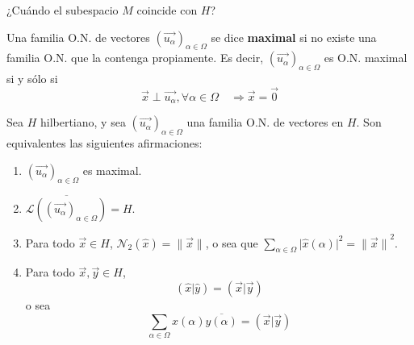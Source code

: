 \documentclass[12pt]{report}
\theoremstyle{largebreak}
\newcommand\abs[1]{\ensuremath{\big|#1\big|}}
\newcommand\norm[1]{\ensuremath{\|#1\|}}
\newcommand\pint[2]{\ensuremath{\left(#1\big| #2\right)}}
\newcommand\conj[1]{\ensuremath{\overline{#1}}}
\newcommand{\N}[2]{\ensuremath{\mathcal{N}_{#1}\left(#2\right)}}
\begin{document}
    ¿Cuándo el subespacio $M$ coincide con $H$?

    \begin{mydef}
        Una familia O.N. de vectores $\left(\vec{u_\alpha} \right)_{\alpha\in\Omega}$ se dice \textbf{maximal} si no existe una familia O.N. que la contenga propiamente. Es decir, $\left(\vec{u_\alpha} \right)_{\alpha\in\Omega}$ es O.N. maximal si y sólo si
        \begin{equation*}
            \vec{x}\perp\vec{u_\alpha},\forall\alpha\in\Omega\quad\Rightarrow\vec{x}=\vec{0}
        \end{equation*}
    \end{mydef}

    \begin{theor}
        Sea $H$ hilbertiano, y sea $\left(\vec{u_\alpha} \right)_{\alpha\in\Omega}$ una familia O.N. de vectores en $H$. Son equivalentes las siguientes afirmaciones:
        \begin{enumerate}
            \item $\left(\vec{u_\alpha} \right)_{\alpha\in\Omega}$ es maximal.
            \item $\overline{\mathcal{L}\left(\left(\vec{u_\alpha} \right)_{\alpha\in\Omega}\right)}=H$.
            \item Para todo $\vec{x}\in H$, $\N{2}{\hat{x}}=\norm{\vec{x}}$, o sea que $\sum_{\alpha\in\Omega}\abs{\hat{x}(\alpha)}^2=\norm{\vec{x}}^2$.
            \item Para todo $\vec{x},\vec{y}\in H$,
            \begin{equation*}
                \pint{\hat{x}}{\hat{y}}=\pint{\vec{x}}{\vec{y}}
            \end{equation*}
            o sea
            \begin{equation*}
                \sum_{\alpha\in\Omega}x(\alpha)\conj{y(\alpha)}=\pint{\vec{x}}{\vec{y}}
            \end{equation*}
        \end{enumerate}

    \end{theor}
\end{document}
